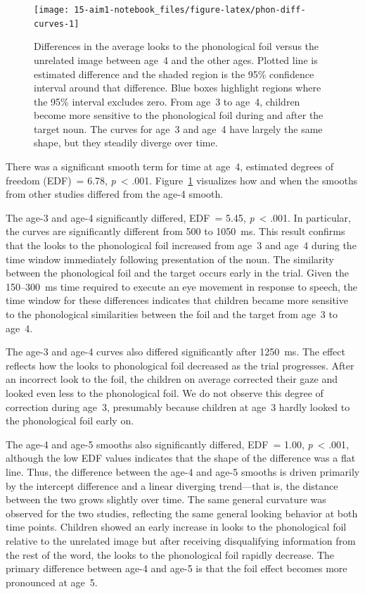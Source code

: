 \documentclass [11pt, proquest] {uwthesis}[2015/03/03]
\begin{document}
\begin{figure}
\texttt{[image: 15-aim1-notebook\_files/figure-latex/phon-diff-curves-1]} \caption{Differences in the average looks to the
phonological foil versus the unrelated image between age~4 and the other
ages. Plotted line is estimated difference and the shaded region is the
95\% confidence interval around that difference. Blue boxes highlight
regions where the 95\% interval excludes zero. From age~3 to age~4,
children become more sensitive to the phonological foil during and after
the target noun. The curves for age~3 and age~4 have largely the same
shape, but they steadily diverge over time.}\label{fig:phon-diff-curves}
\end{figure}
There was a significant smooth term for time at age~4, estimated degrees
of freedom (EDF)~= 6.78, \emph{p}~\textless{} .001.
Figure~\ref{fig:phon-diff-curves} visualizes how and when the smooths
from other studies differed from the age-4 smooth.

The age-3 and age-4 significantly differed, EDF~= 5.45,
\emph{p}~\textless{} .001. In particular, the curves are significantly
different from 500 to 1050~ms. This result confirms that the looks to
the phonological foil increased from age~3 and age~4 during the time
window immediately following presentation of the noun. The similarity
between the phonological foil and the target occurs early in the trial.
Given the 150--300~ms time required to execute an eye movement in
response to speech, the time window for these differences indicates that
children became more sensitive to the phonological similarities between
the foil and the target from age~3 to age~4.

The age-3 and age-4 curves also differed significantly after 1250~ms.
The effect reflects how the looks to phonological foil decreased as the
trial progresses. After an incorrect look to the foil, the children on
average corrected their gaze and looked even less to the phonological
foil. We do not observe this degree of correction during age~3,
presumably because children at age~3 hardly looked to the phonological
foil early on.

The age-4 and age-5 smooths also significantly differed, EDF~= 1.00,
\emph{p}~\textless{} .001, although the low EDF values indicates that
the shape of the difference was a flat line. Thus, the difference
between the age-4 and age-5 smooths is driven primarily by the intercept
difference and a linear diverging trend---that is, the distance between
the two grows slightly over time. The same general curvature was
observed for the two studies, reflecting the same general looking
behavior at both time points. Children showed an early increase in looks
to the phonological foil relative to the unrelated image but after
receiving disqualifying information from the rest of the word, the looks
to the phonological foil rapidly decrease. The primary difference
between age-4 and age-5 is that the foil effect becomes more pronounced
at age~5.
\end{document}
